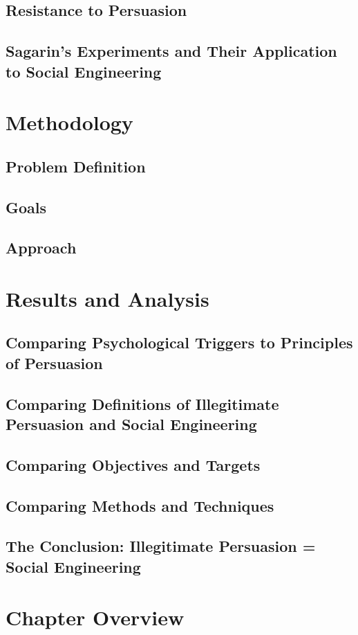 \documentclass{article}
\begin{document}
\subsection{Resistance to Persuasion}
\subsection{Sagarin's Experiments and Their Application to Social Engineering}
\section{Methodology}
\subsection{Problem Definition}
\subsection {Goals}
\subsection{Approach}
\section{Results and Analysis}
\subsection{Comparing Psychological Triggers to Principles of Persuasion}
\subsection{Comparing Definitions of Illegitimate Persuasion and Social Engineering}
\subsection{Comparing Objectives and Targets}
\subsection{Comparing Methods and Techniques}
\subsection{The Conclusion: Illegitimate Persuasion = Social Engineering}
\section{Chapter Overview}
\end{document}
